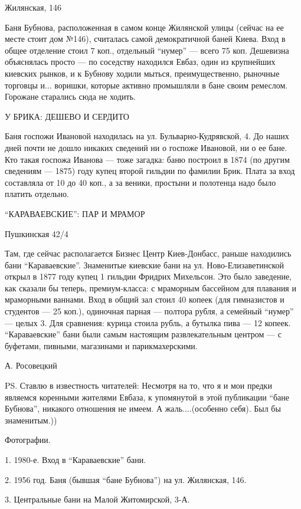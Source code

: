 Жилянская, 146

Баня Бубнова, расположенная в самом конце Жилянской улицы (сейчас на ее месте
стоит дом №146), считалась самой демократичной баней Киева. Вход в общее
отделение стоил 7 коп., отдельный \enquote{нумер} — всего 75 коп. Дешевизна объяснялась
просто — по соседству находился Евбаз, один из крупнейших киевских рынков, и к
Бубнову ходили мыться, преимущественно, рыночные торговцы и... воришки, которые
активно промышляли в бане своим ремеслом. Горожане старались сюда не ходить.

У БРИКА: ДЕШЕВО И СЕРДИТО

Баня госпожи Ивановой находилась на ул. Бульварно-Кудрявской, 4. До наших дней
почти не дошло никаких сведений ни о госпоже Ивановой, ни о ее бане. Кто такая
госпожа Иванова — тоже загадка: баню построил в 1874 (по другим сведениям —
1875) году купец второй гильдии по фамилии Брик. Плата за вход составляла от 10
до 40 коп., а за веники, простыни и полотенца надо было платить отдельно.

\enquote{КАРАВАЕВСКИЕ}: ПАР И МРАМОР

Пушкинская 42/4

Там, где сейчас располагается Бизнес Центр Киев-Донбасс, раньше находились бани
\enquote{Караваевские}. Знаменитые киевские бани на ул. Ново-Елизаветинской открыл в
1877 году купец 1 гильдии Фридрих Михельсон. Это было заведение, как сказали бы
теперь, премиум-класса: с мраморным бассейном для плавания и мраморными
ваннами. Вход в общий зал стоил 40 копеек (для гимназистов и студентов — 25
коп.), одиночная парная — полтора рубля, а семейный \enquote{нумер} — целых 3. Для
сравнения: курица стоила рубль, а бутылка пива — 12 копеек. \enquote{Караваевские} бани
были самым настоящим развлекательным центром — с буфетами, пивными, магазинами
и парикмахерскими.

А. Росовецкий

PS. Ставлю в известность читателей: Несмотря на то, что я и мои предки являемся
коренными жителями Евбаза, к упомянутой в этой публикации \enquote{бане Бубнова},
никакого отношения не имеем. А жаль....(особенно себя). Был бы знаменитым.))

Фотографии. 

1. 1980-е. Вход в \enquote{Караваевские} бани. 

2. 1956 год. Баня (бывшая \enquote{бане Бубнова}) на ул. Жилянская, 146. 

3. Центральные бани на Малой Житомирской, 3-А.

